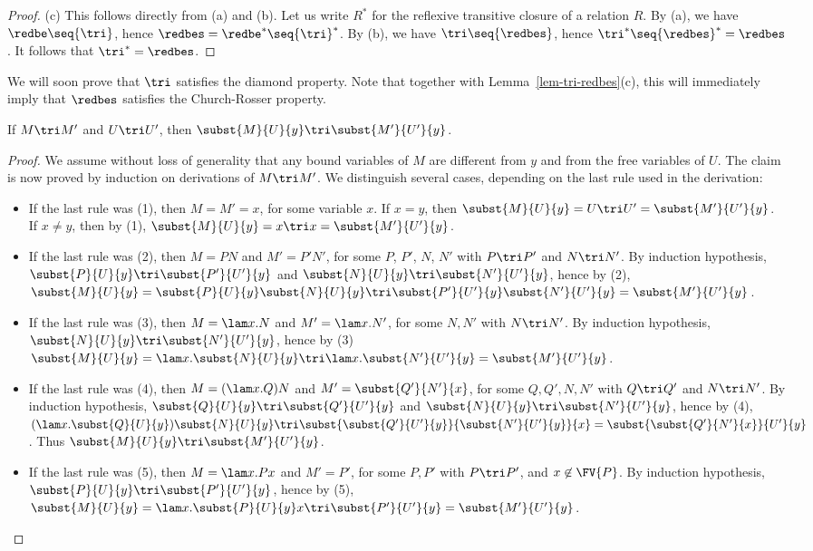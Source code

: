 \documentclass[12pt]{article}
\begin{document}
\begin{proof}
  (c) This follows directly from (a) and (b). Let us write $R^*$ for
  the reflexive transitive closure of a relation $R$. By (a), we have
  ${\redbe}\seq{\tri}$, hence ${\redbes}={\redbe}^*\seq{\tri}^*$. By
  (b), we have ${\tri}\seq{\redbes}$, hence
  ${\tri}^*\seq{\redbes}^*={\redbes}$. It follows that
  ${\tri}^*={\redbes}$.\eot
\end{proof}

We will soon prove that $\tri$ satisfies the diamond property.  Note
that together with Lemma~\ref{lem-tri-redbes}(c), this will
immediately imply that $\redbes$ satisfies the Church-Rosser property.

\begin{lemma}[Substitution]
If $M \tri M'$ and $U \tri U'$, then
$\subst{M}{U}{y} \tri \subst{M'}{U'}{y}$.
\end{lemma}

\begin{proof}
  We assume without loss of generality that any bound variables of $M$
  are different from $y$ and from the free variables of $U$. The claim
  is now proved by induction on derivations of $M\tri M'$. We
  distinguish several cases, depending on the last rule used in the
  derivation:
  \begin{itemize}
  \item If the last rule was (1), then $M=M'=x$, for some variable
    $x$. If $x=y$, then $\subst{M}{U}{y}=U\tri U'=\subst{M'}{U'}{y}$.
    If $x\neq y$, then by (1), $\subst{M}{U}{y}=x\tri
    x=\subst{M'}{U'}{y}$.
  \item If the last rule was (2), then $M=PN$ and $M'=P'N'$, for some
    $P$, $P'$, $N$, $N'$ with $P\tri P'$ and $N\tri N'$. By induction
    hypothesis, $\subst{P}{U}{y}\tri \subst{P'}{U'}{y}$ and
    $\subst{N}{U}{y}\tri \subst{N'}{U'}{y}$, hence by (2),
    $\subst{M}{U}{y}=\subst{P}{U}{y}\subst{N}{U}{y} \tri 
    \subst{P'}{U'}{y}\subst{N'}{U'}{y} = \subst{M'}{U'}{y}$.
  \item If the last rule was (3), then $M=\lam x.N$ and $M'=\lam
    x.N'$, for some $N,N'$ with $N\tri N'$. By induction hypothesis,
    $\subst{N}{U}{y}\tri \subst{N'}{U'}{y}$, hence by (3)
    $\subst{M}{U}{y}=\lam x.\subst{N}{U}{y} \tri \lam
    x.\subst{N'}{U'}{y} = \subst{M'}{U'}{y}$.
  \item If the last rule was (4), then $M=(\lam x.Q)N$ and
    $M'=\subst{Q'}{N'}{x}$, for some $Q,Q',N,N'$ with $Q\tri Q'$ and
    $N\tri N'$.  By induction hypothesis, $\subst{Q}{U}{y}\tri
    \subst{Q'}{U'}{y}$ and $\subst{N}{U}{y}\tri \subst{N'}{U'}{y}$,
    hence by (4), $(\lam x.\subst{Q}{U}{y})\subst{N}{U}{y} \tri
    \subst{\subst{Q'}{U'}{y}}{\subst{N'}{U'}{y}}{x} =
    \subst{\subst{Q'}{N'}{x}}{U'}{y}$. Thus $\subst{M}{U}{y}
    \tri \subst{M'}{U'}{y}$.
  \item If the last rule was (5), then $M=\lam x.Px$ and $M'=P'$, for
    some $P,P'$ with $P\tri P'$, and $x\not\in\FV{P}$. By induction
    hypothesis, $\subst{P}{U}{y}\tri \subst{P'}{U'}{y}$, hence by (5),
    $\subst{M}{U}{y}=\lam x.\subst{P}{U}{y}x \tri
    \subst{P'}{U'}{y}=\subst{M'}{U'}{y}$.\eot
  \end{itemize}
\end{proof}
  
\end{document}

